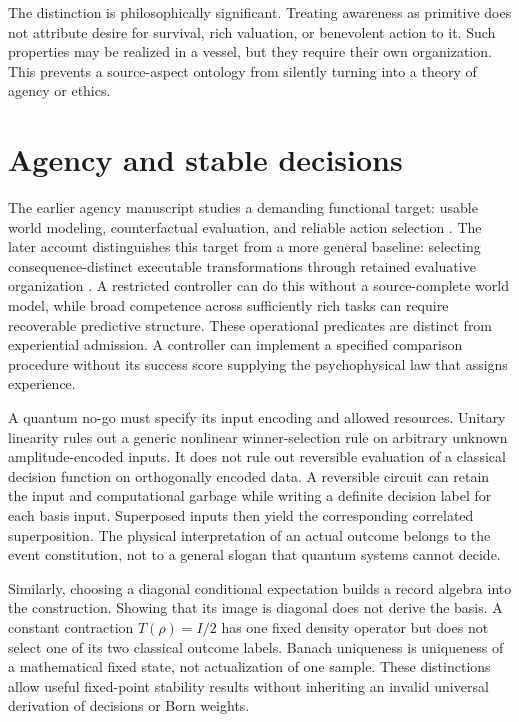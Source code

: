 The distinction is philosophically significant. Treating awareness as primitive does not attribute desire for survival, rich valuation, or benevolent action to it. Such properties may be realized in a vessel, but they require their own organization. This prevents a source-aspect ontology from silently turning into a theory of agency or ethics.

\section{Agency and stable decisions}\label{section:resources:agency-and-stable-decisions}
The earlier agency manuscript studies a demanding functional target: usable world modeling, counterfactual evaluation, and reliable action selection \cite{RodgersAgency}. The later account distinguishes this target from a more general baseline: selecting consequence-distinct executable transformations through retained evaluative organization \cite[Section~2]{RodgersReflectiveFreedom}. A restricted controller can do this without a source-complete world model, while broad competence across sufficiently rich tasks can require recoverable predictive structure. These operational predicates are distinct from experiential admission. A controller can implement a specified comparison procedure without its success score supplying the psychophysical law that assigns experience.

A quantum no-go must specify its input encoding and allowed resources. Unitary linearity rules out a generic nonlinear winner-selection rule on arbitrary unknown amplitude-encoded inputs. It does not rule out reversible evaluation of a classical decision function on orthogonally encoded data. A reversible circuit can retain the input and computational garbage while writing a definite decision label for each basis input. Superposed inputs then yield the corresponding correlated superposition. The physical interpretation of an actual outcome belongs to the event constitution, not to a general slogan that quantum systems cannot decide.

Similarly, choosing a diagonal conditional expectation builds a record algebra into the construction. Showing that its image is diagonal does not derive the basis. A constant contraction $T(\rho)=I/2$ has one fixed density operator but does not select one of its two classical outcome labels. Banach uniqueness is uniqueness of a mathematical fixed state, not actualization of one sample. These distinctions allow useful fixed-point stability results without inheriting an invalid universal derivation of decisions or Born weights.

